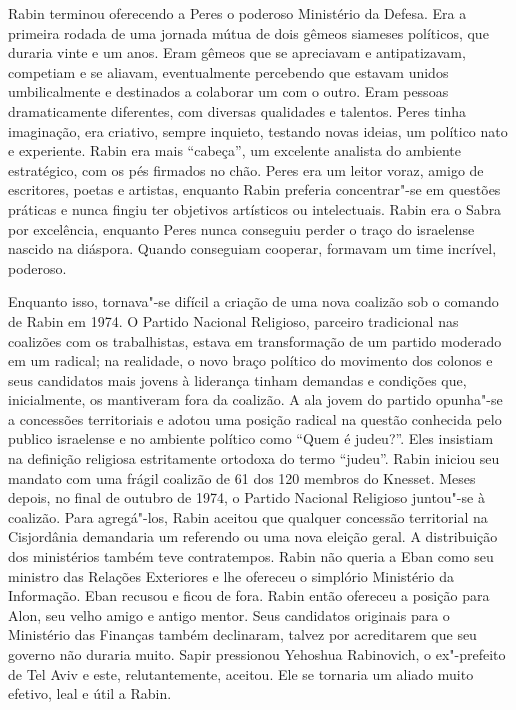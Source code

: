 Rabin terminou oferecendo a Peres o poderoso Ministério da Defesa. Era a
primeira rodada de uma jornada mútua de dois gêmeos siameses políticos,
que duraria vinte e um anos. Eram gêmeos que se apreciavam e
antipatizavam, competiam e se aliavam, eventualmente percebendo que
estavam unidos umbilicalmente e destinados a colaborar um com o outro.
Eram pessoas dramaticamente diferentes, com diversas qualidades e
talentos. Peres tinha imaginação, era criativo, sempre inquieto, testando
novas ideias, um político nato e experiente. Rabin era mais ``cabeça'',
um excelente analista do ambiente estratégico, com os pés firmados
no chão. Peres era um leitor voraz, amigo de escritores, poetas e
artistas, enquanto Rabin preferia concentrar"-se em questões práticas e
nunca fingiu ter objetivos artísticos ou intelectuais. Rabin era o Sabra
por excelência, enquanto Peres nunca conseguiu perder o traço do
israelense nascido na diáspora. Quando conseguiam cooperar, formavam um
time incrível, poderoso.

Enquanto isso, tornava"-se difícil a criação de uma nova coalizão sob o
comando de Rabin em 1974. O Partido Nacional Religioso, parceiro
tradicional nas coalizões com os trabalhistas, estava em transformação
de um partido moderado em um radical; na realidade, o novo braço
político do movimento dos colonos e seus candidatos mais jovens à
liderança tinham demandas e condições que, inicialmente, os mantiveram
fora da coalizão. A ala jovem do partido opunha"-se a concessões
territoriais e adotou uma posição radical na questão conhecida pelo
publico israelense e no ambiente político como ``Quem é judeu?''. Eles
insistiam na definição religiosa estritamente ortodoxa do termo
``judeu''. Rabin iniciou seu mandato com uma frágil coalizão de 61 dos
120 membros do Knesset. Meses depois, no final de outubro de 1974, o
Partido Nacional Religioso juntou"-se à coalizão. Para agregá"-los, Rabin
aceitou que qualquer concessão territorial na Cisjordânia demandaria um
referendo ou uma nova eleição geral. A distribuição dos ministérios
também teve contratempos. Rabin não queria a Eban como seu ministro das
Relações Exteriores e lhe ofereceu o simplório Ministério da Informação.
Eban recusou e ficou de fora. Rabin então ofereceu a posição para Alon,
seu velho amigo e antigo mentor. Seus candidatos originais para o
Ministério das Finanças também declinaram, talvez por acreditarem que
seu governo não duraria muito. Sapir pressionou Yehoshua Rabinovich, o
ex"-prefeito de Tel Aviv e este, relutantemente, aceitou. Ele se tornaria
um aliado muito efetivo, leal e útil a Rabin.

